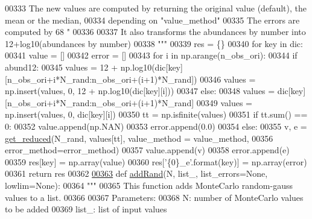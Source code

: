 \begin{DoxyCode}
{{{{{00333 \textcolor{stringliteral}{    The new values are computed by returning the original value (default), the mean or the median, }
00334 \textcolor{stringliteral}{        depending on "value\_method"}
00335 \textcolor{stringliteral}{    The errors are computed by 68%
      "}
00336 \textcolor{stringliteral}{    }
00337 \textcolor{stringliteral}{    It also transforms the abundances by number into 12+log10(abundances by number)}
00338 \textcolor{stringliteral}{    """}
00339     res = \{\}
00340     \textcolor{keywordflow}{for} key \textcolor{keywordflow}{in} dic:
00341         value = []
00342         error = []
00343         \textcolor{keywordflow}{for} i \textcolor{keywordflow}{in} np.arange(n\_obs\_ori):
00344             \textcolor{keywordflow}{if} abund12:
00345                 values = 12 + np.log10(dic[key][n\_obs\_ori+i*N\_rand:n\_obs\_ori+(i+1)*N\_rand])
00346                 values = np.insert(values, 0, 12 + np.log10(dic[key][i]))
00347             \textcolor{keywordflow}{else}:
00348                 values = dic[key][n\_obs\_ori+i*N\_rand:n\_obs\_ori+(i+1)*N\_rand]
00349                 values = np.insert(values, 0, dic[key][i])
00350             tt = np.isfinite(values)
00351             \textcolor{keywordflow}{if} tt.sum() == 0:
00352                 value.append(np.NAN)
00353                 error.append(0.0)
00354             \textcolor{keywordflow}{else}:
00355                 v, e = \hyperlink{namespacepyneb_1_1utils_1_1misc_ae69de9c9e8f8bde114b8edd326f3b993}{get\_reduced}(N\_rand, values[tt], value\_method = value\_method, 
00356                                    error\_method=error\_method)
00357                 value.append(v)
00358                 error.append(e)
00359         res[key] = np.array(value)
00360         res[\textcolor{stringliteral}{'\{0\}\_e'}.format(key)] = np.array(error)
00361     \textcolor{keywordflow}{return} res
00362 
\hypertarget{misc_8py_source_l00363}{}\hyperlink{namespacepyneb_1_1utils_1_1misc_af39dcb3c2627e5f29063e47ca4327f94}{00363} \textcolor{keyword}{def }\hyperlink{namespacepyneb_1_1utils_1_1misc_af39dcb3c2627e5f29063e47ca4327f94}{addRand}(N, list\_, list\_errors=None, lowlim=None):
00364     \textcolor{stringliteral}{"""}
00365 \textcolor{stringliteral}{    This function adds MonteCarlo random-gauss values to a list.}
00366 \textcolor{stringliteral}{    }
00367 \textcolor{stringliteral}{    Parameters:}
00368 \textcolor{stringliteral}{        N: number of MonteCarlo values to be added}
00369 \textcolor{stringliteral}{        list\_: list of input values}
}}}}}
\end{DoxyCode}
